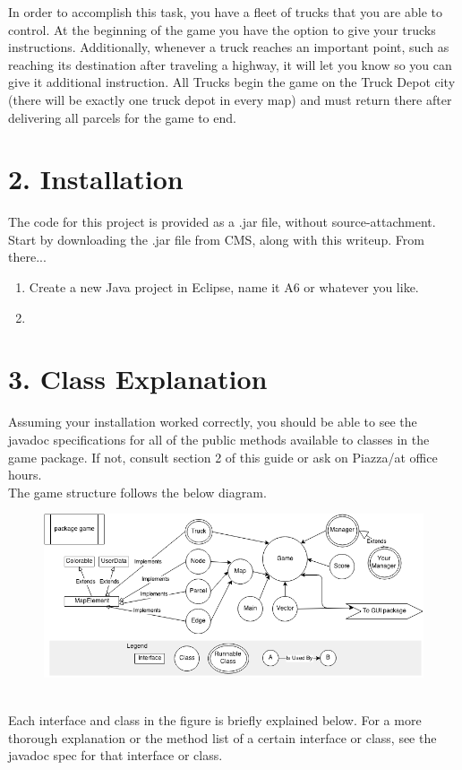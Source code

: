 \documentclass[11pt]{article}
\begin{document}
In order to accomplish this task, you have a fleet of trucks that you are able to control. At the beginning of the game you have the option to give your trucks instructions. Additionally, whenever a truck reaches an important point, such as reaching its destination after traveling a highway, it will let you know so you can give it additional instruction. All Trucks begin the game on the Truck Depot city (there will be exactly one truck depot in every map) and must return there after delivering all parcels for the game to end.

\newpage
\section{2. Installation}
The code for this project is provided as a .jar file, without source-attachment. Start by downloading the .jar file from CMS, along with this writeup. From there...
\begin{enumerate}
\item Create a new Java project in Eclipse, name it A6 or whatever you like.
\item 


\end{enumerate}

\newpage
\section{3. Class Explanation}
Assuming your installation worked correctly, you should be able to see the javadoc specifications for all of the public methods available to classes in the game package. If not, consult section 2 of this guide or ask on Piazza/at office hours.\\
The game structure follows the below diagram.
\begin{figure}[h]
\centerline{\includegraphics[scale=0.7]{hirearchy.png}} 
\end{figure}
\\Each interface and class in the figure is briefly explained below. For a more thorough  explanation or the method list of a certain interface or class, see the javadoc spec for that interface or class.
\end{document}

